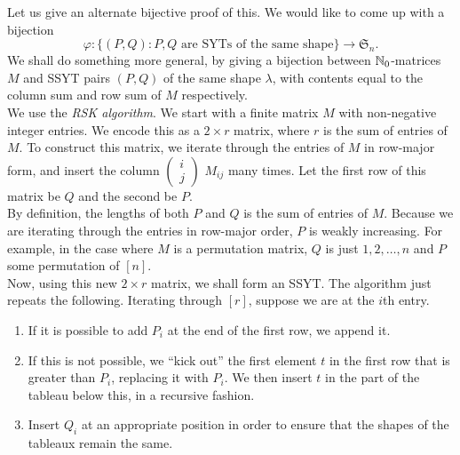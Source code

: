 	Let us give an alternate bijective proof of this.
	We would like to come up with a bijection 
	\[ \varphi : \{(P,Q) : P,Q \text{ are SYTs of the same shape}\} \to \mathfrak{S}_n. \]
	We shall do something more general, by giving a bijection between $\mathbb{N}_0$-matrices $M$ and SSYT pairs $(P,Q)$ of the same shape $\lambda$, with contents equal to the column sum and row sum of $M$ respectively. \\
	We use the \emph{RSK algorithm}. We start with a finite matrix $M$ with non-negative integer entries. We encode this as a $2 \times r$ matrix, where $r$ is the sum of entries of $M$. To construct this matrix, we iterate through the entries of $M$ in row-major form, and insert the column $\begin{pmatrix} i \\ j \end{pmatrix}$ $M_{ij}$ many times. Let the first row of this matrix be $Q$ and the second be $P$.\\
	By definition, the lengths of both $P$ and $Q$ is the sum of entries of $M$. Because we are iterating through the entries in row-major order, $P$ is weakly increasing. For example, in the case where $M$ is a permutation matrix, $Q$ is just $1,2,\ldots,n$ and $P$ some permutation of $[n]$.\\
	Now, using this new $2 \times r$ matrix, we shall form an SSYT. The algorithm just repeats the following. Iterating through $[r]$, suppose we are at the $i$th entry.
	\begin{enumerate}
		\item If it is possible to add $P_i$ at the end of the first row, we append it.
		\item If this is not possible, we ``kick out'' the first element $t$ in the first row that is greater than $P_i$, replacing it with $P_i$. We then insert $t$ in the part of the tableau below this, in a recursive fashion.
		\item Insert $Q_i$ at an appropriate position in order to ensure that the shapes of the tableaux remain the same.
	\end{enumerate}

